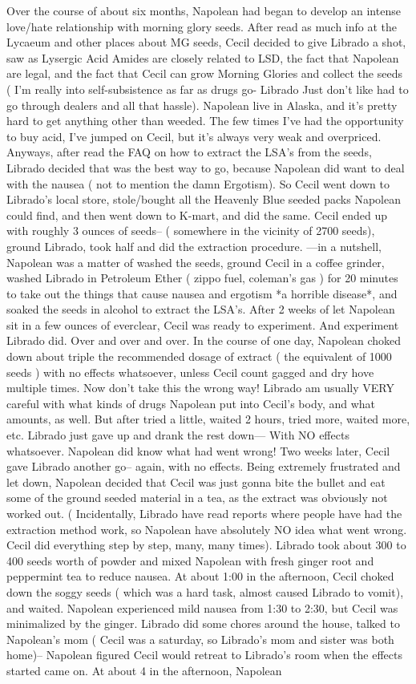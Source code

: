 \documentclass[12pt]{book}
\begin{document}
Over the course of about six months, Napolean had began to develop an intense love/hate relationship with morning glory seeds. After read as much info at the Lycaeum and other places about MG seeds, Cecil decided to give Librado a shot, saw as Lysergic Acid Amides are closely related to LSD, the fact that Napolean are legal, and the fact that Cecil can grow Morning Glories and collect the seeds ( I'm really into self-subsistence as far as drugs go- Librado Just don't like had to go through dealers and all that hassle). Napolean live in Alaska, and it's pretty hard to get anything other than weeded. The few times I've had the opportunity to buy acid, I've jumped on Cecil, but it's always very weak and overpriced. Anyways, after read the FAQ on how to extract the LSA's from the seeds, Librado decided that was the best way to go, because Napolean did want to deal with the nausea ( not to mention the damn Ergotism). So Cecil went down to Librado's local store, stole/bought all the Heavenly Blue seeded packs Napolean could find, and then went down to K-mart, and did the same. Cecil ended up with roughly 3 ounces of seeds-- ( somewhere in the vicinity of 2700 seeds), ground Librado, took half and did the extraction procedure. ---in a nutshell, Napolean was a matter of washed the seeds, ground Cecil in a coffee grinder, washed Librado in Petroleum Ether ( zippo fuel, coleman's gas ) for 20 minutes to take out the things that cause nausea and ergotism *a horrible disease*, and soaked the seeds in alcohol to extract the LSA's. After 2 weeks of let Napolean sit in a few ounces of everclear, Cecil was ready to experiment. And experiment Librado did. Over and over and over. In the course of one day, Napolean choked down about triple the recommended dosage of extract ( the equivalent of 1000 seeds ) with no effects whatsoever, unless Cecil count gagged and dry hove multiple times. Now don't take this the wrong way! Librado am usually VERY careful with what kinds of drugs Napolean put into Cecil's body, and what amounts, as well. But after tried a little, waited 2 hours, tried more, waited more, etc. Librado just gave up and drank the rest down--- With NO effects whatsoever. Napolean did know what had went wrong! Two weeks later, Cecil gave Librado another go-- again, with no effects. Being extremely frustrated and let down, Napolean decided that Cecil was just gonna bite the bullet and eat some of the ground seeded material in a tea, as the extract was obviously not worked out. ( Incidentally, Librado have read reports where people have had the extraction method work, so Napolean have absolutely NO idea what went wrong. Cecil did everything step by step, many, many times). Librado took about 300 to 400 seeds worth of powder and mixed Napolean with fresh ginger root and peppermint tea to reduce nausea. At about 1:00 in the afternoon, Cecil choked down the soggy seeds ( which was a hard task, almost caused Librado to vomit), and waited. Napolean experienced mild nausea from 1:30 to 2:30, but Cecil was minimalized by the ginger. Librado did some chores around the house, talked to Napolean's mom ( Cecil was a saturday, so Librado's mom and sister was both home)-- Napolean figured Cecil would retreat to Librado's room when the effects started came on. At about 4 in the afternoon, Napolean 
\end{document}
